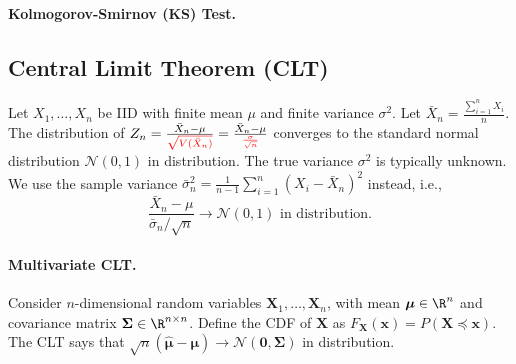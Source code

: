         \paragraph{Kolmogorov-Smirnov (KS) Test.}

      
    
    \subsection{Central Limit Theorem (CLT)}\label{sec:CLT}
        Let $X_1, \ldots, X_n$ be IID with finite mean $\mu$ and finite variance $\sigma^2$. 
        Let $\bar{X}_n = \frac{\sum_{i=1}^{n}{X_i}}{n}$.
        The distribution of $Z_n=\frac{\bar{X}_n - \mu}{\color{red}\sqrt{V(\bar{X}_n)}} = \frac{\bar{X}_n - \mu}{\color{red}\frac{\sigma}{\sqrt{n}}}$ converges to the standard normal distribution $\mathcal{N}(0, 1)$ in distribution. 
        The true variance $\sigma^2$ is typically unknown. 
        We use the sample variance $\bar{\sigma}_n^2 = \frac{1}{n-1}\sum_{i=1}^{n}{(X_i - \bar{X}_n)^2}$ instead, i.e.,
        \begin{equation}
            \frac{\bar{X}_n - \mu}{\bar{\sigma}_n / \sqrt{n}} \rightarrow \mathcal{N}(0, 1) \text{ in distribution}.
        \end{equation}

        \paragraph{Multivariate CLT.}
            Consider $n$-dimensional random variables $\bm{X}_1, \ldots, \bm{X}_n$, with mean $\bm{\mu} \in \R^n$ and covariance matrix $\bm{\Sigma} \in \R^{n \times n}$.
            Define the CDF of $\bm{X}$ as $F_{\bm{X}}(\bm{x}) = P( \bm{X} \preceq \bm{x})$.
            The CLT says that $\sqrt{n}(\hat{\bm{\mu}} - \bm{\mu}) \rightarrow \mathcal{N}(\bm{0}, \bm{\Sigma})$ in distribution.
    

